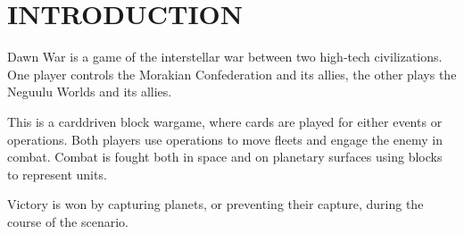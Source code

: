 \section{INTRODUCTION}

Dawn War is a game of the interstellar war between two high-tech civilizations. One player controls the Morakian Confederation and its allies, the other plays the Neguulu Worlds and its allies.

This is a carddriven block wargame, where cards are played for either events or operations. Both players use operations to move fleets and engage the enemy in combat. Combat is fought both in space and on planetary surfaces using blocks to represent units.

Victory is won by capturing planets, or preventing their capture, during the course of the scenario.